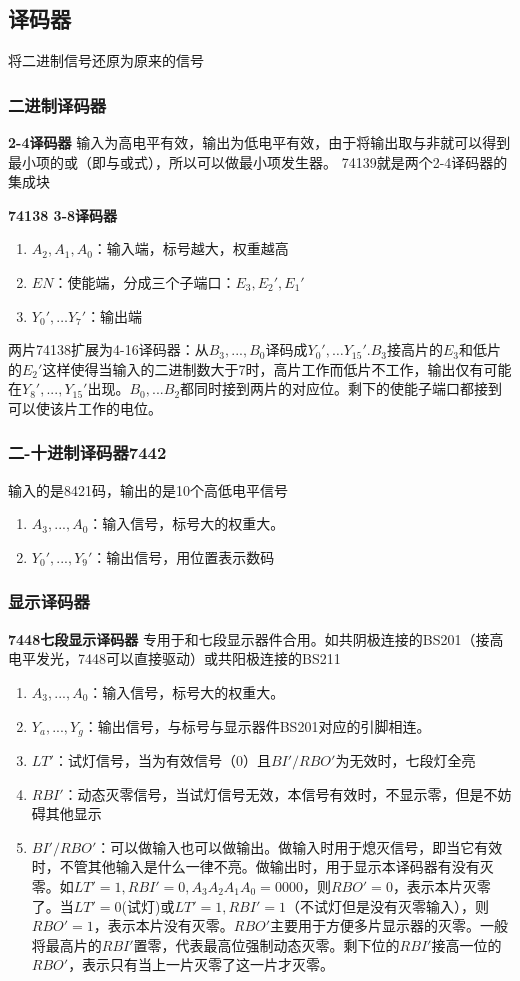 \documentclass{ctexart}
\newcommand*{\noindbf}[1]{{\noindent \bf{#1} \qquad}}
\begin{document}
\subsection{译码器}
将二进制信号还原为原来的信号
\subsubsection{二进制译码器}
\noindbf{2-4译码器} 输入为高电平有效，输出为低电平有效，由于将输出取与非就可以得到最小项的或（即与或式），所以可以做最小项发生器。
74139就是两个2-4译码器的集成块

\noindbf{74138 3-8译码器}
\begin{enumerate}
    \item $A_2,A_1,A_0$：输入端，标号越大，权重越高
    \item $EN$：使能端，分成三个子端口：$E_3,E_2',E_1'$
    \item $Y_0',\dots Y_7'$：输出端
\end{enumerate}
两片74138扩展为4-16译码器：从$B_3,...,B_0$译码成$Y_0',\dots Y_{15}'$.$B_3$接高片的$E_3$和低片的$E_2'$这样使得当输入的二进制数大于7时，高片工作而低片不工作，输出仅有可能在$Y_8',...,Y_{15}'$出现。$B_0,...B_2$都同时接到两片的对应位。剩下的使能子端口都接到可以使该片工作的电位。
\subsubsection{二-十进制译码器7442}
输入的是8421码，输出的是10个高低电平信号
\begin{enumerate}
    \item $A_3,...,A_0$：输入信号，标号大的权重大。
    \item $Y_0',...,Y_9'$：输出信号，用位置表示数码
\end{enumerate}
\subsubsection{显示译码器}
\noindbf{7448七段显示译码器}专用于和七段显示器件合用。如共阴极连接的BS201（接高电平发光，7448可以直接驱动）或共阳极连接的BS211
\begin{enumerate}
    \item $A_3,...,A_0$：输入信号，标号大的权重大。
    \item $Y_a,...,Y_g$：输出信号，与标号与显示器件BS201对应的引脚相连。
    \item $LT'$：试灯信号，当为有效信号（0）且$BI'/RBO'$为无效时，七段灯全亮
    \item $RBI'$：动态灭零信号，当试灯信号无效，本信号有效时，不显示零，但是不妨碍其他显示
    \item $BI'/RBO'$：可以做输入也可以做输出。做输入时用于熄灭信号，即当它有效时，不管其他输入是什么一律不亮。做输出时，用于显示本译码器有没有灭零。如$LT'=1,RBI'=0,A_3A_2A_1A_0=0000$，则$RBO'=0$，表示本片灭零了。当$LT'=0$(试灯)或$LT'=1,RBI'=1$（不试灯但是没有灭零输入），则$RBO'=1$，表示本片没有灭零。$RBO'$主要用于方便多片显示器的灭零。一般将最高片的$RBI'$置零，代表最高位强制动态灭零。剩下位的$RBI'$接高一位的$RBO'$，表示只有当上一片灭零了这一片才灭零。
\end{enumerate}
\end{document}
